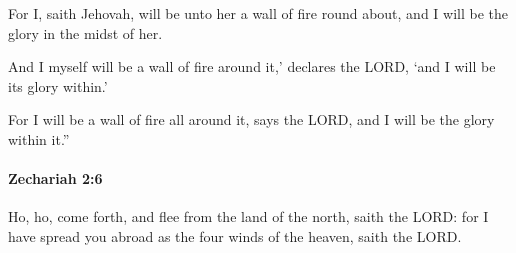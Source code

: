 			\begin{versebox}
					\item[BHS] 
					\item[LXX] 
					\item[ASV] For I, saith Jehovah, will be unto her a wall of fire round about, and I will be the glory in the midst of her.
					\item[NIV] And I myself will be a wall of fire around it,’ declares the LORD, ‘and I will be its glory within.’
					\item[NRSV] For I will be a wall of fire all around it, says the LORD, and I will be the glory within it.”
			\end{versebox}

		\paragraph{Zechariah 2:6} %
			\label{ZECHARIAH-2-6}

			Ho, ho, come forth, and flee from the land of the north, saith the LORD: for I have spread you abroad as the four winds of the heaven, saith the LORD.

